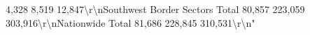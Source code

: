 \documentclass[
  12pt,
]{book}
\newenvironment{Shaded}{\begin{snugshade}}{\end{snugshade}}
\begin{document}
\begin{Shaded}
\begin{Highlighting}[]
                            4,328                      8,519                     12,847\textbackslash{}r\textbackslash{}nSouthwest Border Sectors Total               80,857                    223,059                   303,916\textbackslash{}r\textbackslash{}nNationwide Total                             81,686                    228,845                   310,531\textbackslash{}r\textbackslash{}n"                                                                                                                                                                                                                                                                                                                                                                                                                                                                                                                                                                                                                                                                                                                                                                                                                                                                                                                                                                                                                                                                                                                                                                                                                                                                                                                                                                                                                                                                                                                                                                                                                                                                                                                                                                                                                                                                                                                                                                                                                                                                                                                                                                                                                                                                                                                                                                                                                                                                                                                                                                                                                                                                                                                                                                                                                                                                                                                                                                                                                    
\end{Highlighting}
\end{Shaded}
\end{document}

